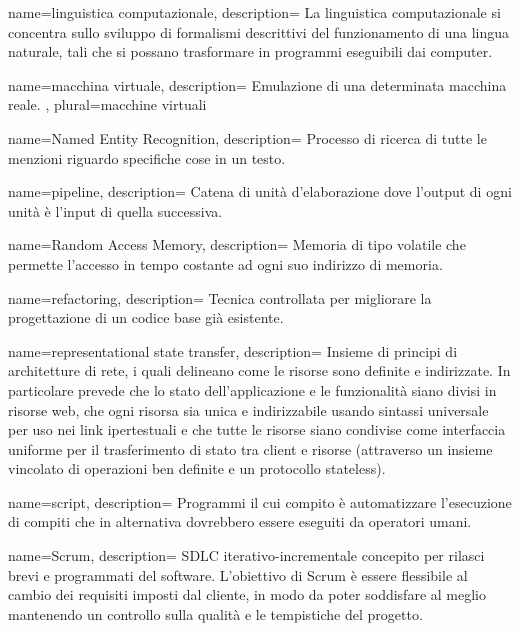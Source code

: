  {
name=linguistica computazionale,
description={
La linguistica computazionale si concentra sullo sviluppo di formalismi
descrittivi del funzionamento di una lingua naturale, tali che si possano
trasformare in programmi eseguibili dai computer.
}
}

 {
name=macchina virtuale,
description={
Emulazione di una determinata macchina reale.
},
plural=macchine virtuali
}

 {
name=Named Entity Recognition,
description={
Processo di ricerca di tutte le menzioni riguardo specifiche cose in un testo.
}
}

 {
name=pipeline,
description={
Catena di unità d'elaborazione dove l'output di ogni unità è l'input di quella
successiva.
}
}

 {
name=Random Access Memory,
description={
Memoria di tipo volatile che permette l'accesso in tempo costante ad ogni suo
indirizzo di memoria.
}
}

 {
name=refactoring,
description={
Tecnica controllata per migliorare la progettazione di un codice base già
esistente.
}
}

 {
name=representational state transfer,
description={
Insieme di principi di architetture di rete, i quali delineano come le risorse
sono definite e indirizzate. In particolare prevede che lo stato
dell’applicazione e le funzionalità siano divisi in risorse web, che ogni
risorsa sia unica e indirizzabile usando sintassi universale per uso nei link
ipertestuali e che tutte le risorse siano condivise come interfaccia uniforme
per il trasferimento di stato tra client e risorse (attraverso un insieme
vincolato di operazioni ben definite e un protocollo stateless).
}
}

 {
name=script,
description={
Programmi il cui compito è automatizzare l'esecuzione di compiti che in
alternativa dovrebbero essere eseguiti da operatori umani.
}
}

 {
name=Scrum,
description={
SDLC iterativo-incrementale concepito per rilasci brevi e programmati del
software. L'obiettivo di Scrum è essere flessibile al cambio dei requisiti
imposti dal cliente, in modo da poter soddisfare al meglio mantenendo un
controllo sulla qualità e le tempistiche del progetto.
}
}

